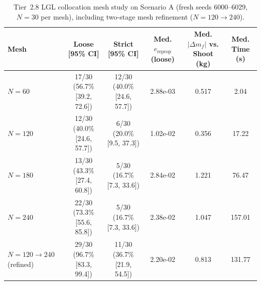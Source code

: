 \begin{table}[t]
\centering
\caption{Tier~2.8 LGL collocation mesh study on Scenario A (fresh seeds 6000--6029, $N=30$ per mesh), including two-stage mesh refinement ($N=120 \to 240$).}
\label{tab:tier2_collocation_mesh}
\begin{tabular}{lccccc}
\toprule
Mesh & Loose [95\% CI] & Strict [95\% CI] & Med. $e_{\mathrm{reprop}}$ (loose) & Med. $|\Delta m_f|$ vs. Shoot (kg) & Med. Time (s) \\
\midrule
$N=60$ & 17/30 (56.7\% [39.2, 72.6]) & 12/30 (40.0\% [24.6, 57.7]) & 2.88e-03 & 0.517 & 2.04 \\
$N=120$ & 12/30 (40.0\% [24.6, 57.7]) & 6/30 (20.0\% [9.5, 37.3]) & 1.02e-02 & 0.356 & 17.22 \\
$N=180$ & 13/30 (43.3\% [27.4, 60.8]) & 5/30 (16.7\% [7.3, 33.6]) & 2.84e-02 & 1.221 & 76.47 \\
$N=240$ & 22/30 (73.3\% [55.6, 85.8]) & 5/30 (16.7\% [7.3, 33.6]) & 2.38e-02 & 1.047 & 157.01 \\
$N=120 \to 240$ (refined) & 29/30 (96.7\% [83.3, 99.4]) & 11/30 (36.7\% [21.9, 54.5]) & 2.20e-02 & 0.813 & 131.77 \\
\bottomrule
\end{tabular}
\end{table}
